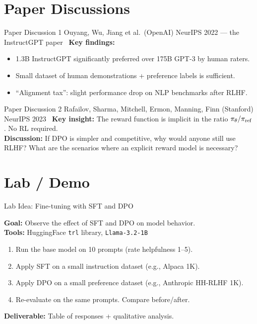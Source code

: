 \documentclass[aspectratio=169,10pt]{beamer}
\begin{document}
\section{Paper Discussions}
\begin{frame}{Paper Discussion 1}
    {Ouyang, Wu, Jiang et al.\ (OpenAI)}
    {NeurIPS 2022 — the InstructGPT paper~\cite{ouyang2022training}}
  \vspace{0.4em}
  \textbf{Key findings:}
  \begin{itemize}
    \item 1.3B InstructGPT significantly preferred over 175B GPT-3 by human raters.
    \item Small dataset of human demonstrations + preference labels is sufficient.
    \item ``Alignment tax'': slight performance drop on NLP benchmarks after RLHF.
  \end{itemize}
\end{frame}

\begin{frame}{Paper Discussion 2}
    {Rafailov, Sharma, Mitchell, Ermon, Manning, Finn (Stanford)}
    {NeurIPS 2023~\cite{rafailov2023direct}}
  \vspace{0.4em}
  \textbf{Key insight:} The reward function is implicit in the ratio $\pi_\theta / \pi_{\text{ref}}$.
  No RL required.\\[0.4em]
  \textbf{Discussion:} If DPO is simpler and competitive, why would anyone still use RLHF?
  What are the scenarios where an explicit reward model is necessary?
\end{frame}

\section{Lab / Demo}
\begin{frame}{Lab Idea: Fine-tuning with SFT and DPO}
  \begin{tcolorbox}[hitbox, title=Lab 3 — Alignment Pipeline]
    \textbf{Goal:} Observe the effect of SFT and DPO on model behavior.\\[4pt]
    \textbf{Tools:} HuggingFace \texttt{trl} library, \texttt{Llama-3.2-1B}
    \begin{enumerate}
      \item Run the base model on 10 prompts (rate helpfulness 1–5).
      \item Apply SFT on a small instruction dataset (e.g., Alpaca 1K).
      \item Apply DPO on a small preference dataset (e.g., Anthropic HH-RLHF 1K).
      \item Re-evaluate on the same prompts. Compare before/after.
    \end{enumerate}
    \textbf{Deliverable:} Table of responses + qualitative analysis.
  \end{tcolorbox}
\end{frame}
\end{document}
